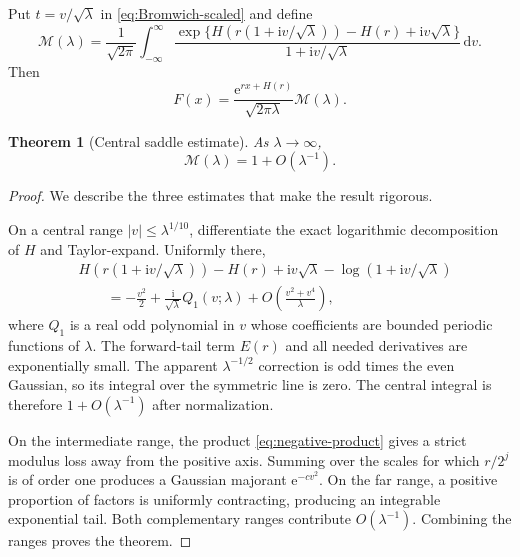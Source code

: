 \documentclass[11pt]{article}
\newtheorem{theorem}{Theorem}[section]
\theoremstyle{definition}
\theoremstyle{remark}
\newcommand{\dd}{\,\mathrm d}\newcommand{\e}{\mathrm e}\newcommand{\ii}{\mathrm i}
\begin{document}
Put $t=v/\sqrt\lambda$ in \eqref{eq:Bromwich-scaled} and define
\begin{equation}\label{eq:mass}
 \mathcal M(\lambda)=\frac1{\sqrt{2\pi}}
 \int_{-\infty}^{\infty}
 \frac{\exp\{H(r(1+\ii v/\sqrt\lambda))-H(r)
 +\ii v\sqrt\lambda\}}
 {1+\ii v/\sqrt\lambda}\dd v.
\end{equation}
Then
\begin{equation}\label{eq:F-mass}
 F(x)=\frac{\e^{rx+H(r)}}{\sqrt{2\pi\lambda}}\mathcal M(\lambda).
\end{equation}

\begin{theorem}[Central saddle estimate]\label{thm:mass}
As $\lambda\to\infty$,
\begin{equation}\label{eq:mass-estimate}
 \mathcal M(\lambda)=1+O(\lambda^{-1}).
\end{equation}
\end{theorem}
\begin{proof}
We describe the three estimates that make the result rigorous.

On a central range $|v|\le\lambda^{1/10}$, differentiate the exact logarithmic decomposition of $H$ and Taylor-expand.  Uniformly there,
\begin{equation}\label{eq:central-expansion}
\begin{aligned}
&H(r(1+\ii v/\sqrt\lambda))-H(r)+\ii v\sqrt\lambda
 -\log(1+\ii v/\sqrt\lambda)\\
&\qquad=-\frac{v^2}{2}+\frac{\ii}{\sqrt\lambda}Q_1(v;\lambda)
 +O\!\left(\frac{v^2+v^4}{\lambda}\right),
\end{aligned}
\end{equation}
where $Q_1$ is a real odd polynomial in $v$ whose coefficients are bounded periodic functions of $\lambda$.  The forward-tail term $E(r)$ and all needed derivatives are exponentially small.  The apparent $\lambda^{-1/2}$ correction is odd times the even Gaussian, so its integral over the symmetric line is zero.  The central integral is therefore $1+O(\lambda^{-1})$ after normalization.

On the intermediate range, the product \eqref{eq:negative-product} gives a strict modulus loss away from the positive axis.  Summing over the scales for which $r/2^j$ is of order one produces a Gaussian majorant $\e^{-cv^2}$.  On the far range, a positive proportion of factors is uniformly contracting, producing an integrable exponential tail.  Both complementary ranges contribute $O(\lambda^{-1})$.  Combining the ranges proves the theorem.
\end{proof}
\end{document}
